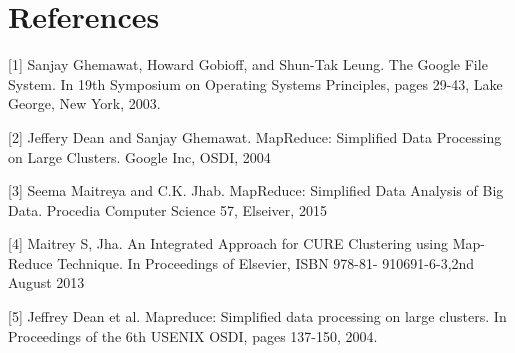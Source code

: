 \documentclass[sigconf]{acmart}
\begin{document}
\section{References}



 



[1] Sanjay Ghemawat, Howard Gobioff, and Shun-Tak Leung.
The Google File System. In 19th Symposium on Operating
Systems Principles, pages 29-43, Lake George,
New York, 2003.

[2] Jeffery Dean and Sanjay Ghemawat.
MapReduce: Simplified Data Processing on Large Clusters. Google Inc, OSDI, 2004

[3] Seema Maitreya and C.K. Jhab.
MapReduce: Simplified Data Analysis of Big
Data. Procedia Computer Science 57, Elseiver, 2015

[4] Maitrey S, Jha. An Integrated Approach for CURE Clustering using Map-Reduce Technique. In Proceedings of Elsevier, ISBN 978-81-
910691-6-3,2nd August 2013

[5] Jeffrey Dean et al. Mapreduce: Simplified data processing on large clusters. In Proceedings of the 6th USENIX OSDI, pages 137-150,
2004.
\end{document}

